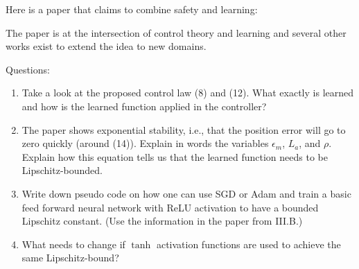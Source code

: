 

\renewcommand{\course}{Robot Learning}
\renewcommand{\coursedate}{Summer 2024}
\renewcommand{\exnum}{Weekly Exercise 8}

\renewcommand{\teacher}{Marc Toussaint \& Wolfgang H{\"o}nig}
\renewcommand{\addressTUB}{
  Learning~\&~Intelligent~Systems Lab, Intelligent Multi-Robot Coordination Lab, TU~Berlin\\\small
  Marchstr. 23, 10587 Berlin, Germany
}

\exercises




\exercisestitle



Here is a paper that claims to combine safety and learning:


The paper is at the intersection of control theory and learning and
several other works exist to extend the idea to new domains.

Questions:
\begin{enumerate}
\item Take a look at the proposed control law (8) and (12). What exactly is learned and how is the learned function applied in the controller?


\item The paper shows exponential stability, i.e., that the position error will go to zero quickly (around (14)).
Explain in words the variables $\epsilon_m$, $L_a$, and $\rho$.
Explain how this equation tells us that the learned function needs to be Lipschitz-bounded.


\item Write down pseudo code on how one can use SGD or Adam and train a basic feed forward neural network with ReLU activation to have a bounded Lipschitz constant. (Use the information in the paper from III.B.)


\item What needs to change if $\tanh$ activation functions are used to achieve the same Lipschitz-bound?


\end{enumerate}


